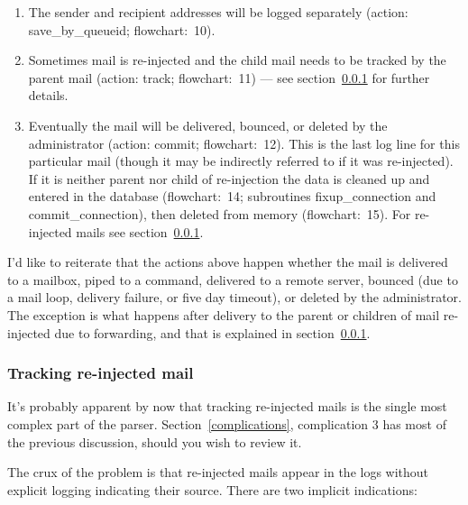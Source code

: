 \documentclass[a4paper,12pt,draft]{article}
\begin{document}
\begin{enumerate}

    \item The sender and recipient addresses will be logged separately
        (action: save\_by\_queueid; flowchart:~10).

    \item Sometimes mail is re-injected and the child mail needs to be
        tracked by the parent mail (action: track; flowchart:~11) --- see
        section~\ref{tracking-re-injected-mail} for further details.

    \item Eventually the mail will be delivered, bounced, or deleted by the
        administrator (action: commit; flowchart:~12).  This is the last
        log line for this particular mail (though it may be indirectly
        referred to if it was re-injected).  If it is neither parent nor
        child of re-injection the data is cleaned up and entered in the
        database (flowchart:~14; subroutines fixup\_connection and
        commit\_connection), then deleted from memory (flowchart:~15).  For
        re-injected mails see section~\ref{tracking-re-injected-mail}.

\end{enumerate}

I'd like to reiterate that the actions above happen whether the mail is
delivered to a mailbox, piped to a command, delivered to a remote server,
bounced (due to a mail loop, delivery failure, or five day timeout), or
deleted by the administrator.  The exception is what happens after delivery
to the parent or children of mail re-injected due to forwarding, and that
is explained in section~\ref{tracking-re-injected-mail}.

\subsubsection{Tracking re-injected mail}

\label{tracking-re-injected-mail}

It's probably apparent by now that tracking re-injected mails is the single
most complex part of the parser.  Section~\ref{complications}, complication
3 has most of the previous discussion, should you wish to review it.  

The crux of the problem is that re-injected mails appear in the logs
without explicit logging indicating their source.  There are two implicit
indications:
\end{document}
